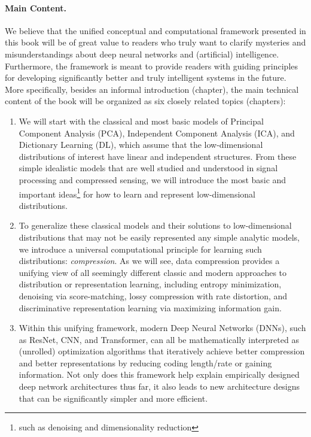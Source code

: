 \documentclass[../../book-main.tex]{subfiles}
\begin{document}
\paragraph{Main Content.}
We believe that the unified conceptual and computational framework
presented in this book will be of great value to readers who truly
want to clarify mysteries and misunderstandings about deep neural
networks and (artificial) intelligence. Furthermore, the framework is
meant to provide readers with guiding principles for developing
significantly better and truly intelligent systems in the future.
More specifically, besides an informal introduction (chapter), the
main technical content of the book will be organized as six closely
related topics (chapters):
\begin{enumerate}
    \item We will start with the classical and most basic models of
        Principal Component Analysis (PCA), Independent Component
        Analysis (ICA), and Dictionary Learning (DL), which assume
        that the low-dimensional distributions of interest have
        linear and independent structures. From these simple
        idealistic models that are well studied and understood in
        signal processing and compressed sensing, we will introduce
        the most basic and important ideas\footnote{such as denoising
        and dimensionality reduction} for how to learn and represent
        low-dimensional distributions.

    \item To generalize these classical models and their solutions to
        low-dimensional distributions that may not be easily
        represented any simple analytic models, we introduce a
        universal computational principle for learning such
        distributions: {\em compression}. As we will see, data
        compression provides a unifying view of all seemingly
        different classic and modern approaches to distribution or
        representation learning, including entropy minimization,
        denoising via score-matching,  lossy compression with rate
        distortion, and discriminative representation learning via maximizing
        information gain.

    \item Within this unifying framework, modern Deep Neural Networks
        (DNNs), such as ResNet, CNN, and Transformer, can all be
        mathematically interpreted as (unrolled) optimization
        algorithms that iteratively achieve better compression and
        better representations by reducing coding length/rate or
        gaining information. Not only does this framework help
        explain empirically designed deep network architectures thus
        far, it also leads to new architecture designs that can be
        significantly simpler and more efficient.


\end{enumerate}
\end{document}
